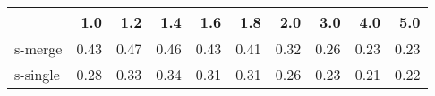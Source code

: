 \begin{tabular}{lrrrrrrrrr}
\toprule
{}       &  1.0 &  1.2 &  1.4 &  1.6 &  1.8 &  2.0 &  3.0 &  4.0 &  5.0 \\
\midrule
s-merge  & 0.43 & 0.47 & 0.46 & 0.43 & 0.41 & 0.32 & 0.26 & 0.23 & 0.23 \\
s-single & 0.28 & 0.33 & 0.34 & 0.31 & 0.31 & 0.26 & 0.23 & 0.21 & 0.22 \\
\bottomrule
\end{tabular}
